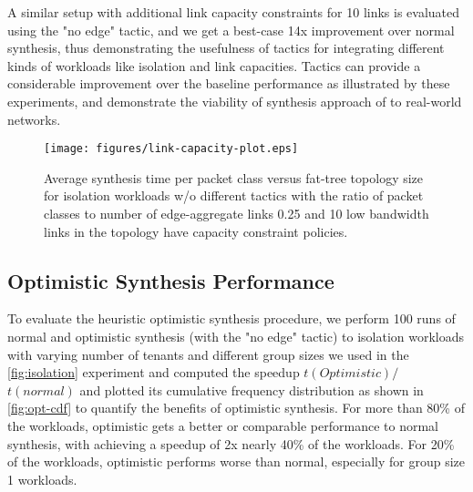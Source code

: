  A similar setup with additional link capacity 
 constraints for 10 links is evaluated using the "no edge" tactic, and we get a best-case 14x
 improvement over normal synthesis, thus demonstrating the usefulness of tactics for 
 integrating different kinds of workloads like isolation and link capacities. 
 Tactics can provide 
 a considerable improvement over the baseline performance as illustrated by these experiments,
 and demonstrate the viability of synthesis approach of \Name to real-world networks.  
 
\begin{figure}[h]
	\texttt{[image: figures/link-capacity-plot.eps]}
	\caption{Average synthesis time per packet class versus fat-tree topology size for isolation workloads 
		w/o different tactics with the ratio of packet classes to number of edge-aggregate links 0.25 and 10 low bandwidth links in the topology 
		have capacity constraint policies.}
	\label{fig:link-capacity}
\end{figure}


\subsection{Optimistic Synthesis Performance} \label{sec:optimisticeval}
To evaluate the heuristic optimistic synthesis procedure, we perform 100 runs of normal and optimistic synthesis (with the "no edge" tactic) to isolation
 workloads with varying number of tenants and different group sizes 
we used in the \cref{fig:isolation} experiment and computed the
 speedup $t(Optimistic)/$ $t(normal)$ and plotted its cumulative frequency
  distribution as shown in \cref{fig:opt-cdf} to quantify the benefits of optimistic 
  synthesis. For more than 80\% of the
workloads, optimistic gets a better or comparable performance to normal synthesis, with
achieving a speedup of 2x nearly 40\% of the workloads. For 20\% of the workloads, optimistic
performs worse than normal, especially for group size 1 workloads.

